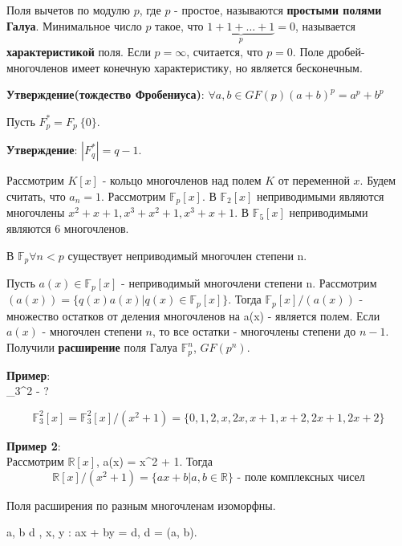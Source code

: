 \documentclass[11pt]{article}
\newcounter{th}\setcounter{th}{0}
\def\th{\par\smallskip\refstepcounter{th}\textbf{\arabic{th}}}
\newtheorem*{Theorem}{Теорема \th}
\begin{document}
Поля вычетов по модулю \(p\), где \(p\) - простое, называются \textbf{простыми полями Галуа}. Минимальное
число \(p\) такое, что \(\underbrace{1 + 1 + \ldots + 1}_{p} = 0\), называется \textbf{характеристикой} поля.
Если \(p = \infty\), считается, что \(p = 0\). Поле дробей-многочленов имеет конечную характеристику,
но является бесконечным.

\textbf{Утверждение(тождество Фробениуса)}: \(\forall a, b \in GF(p) (a + b)^p = a^p + b^p\)

Пусть \(F^*_p = F_p \ \{0\}\).

\textbf{Утверждение}: \(|F^*_q| = q - 1\).

Рассмотрим \(K[x]\) -  кольцо многочленов над полем \(K\) от переменной \(x\). Будем считать, что \(a_n = 1\).
Рассмотрим \(\mathbb{F}_p[x]\).
В \(\mathbb{F}_2[x]\) неприводимыми являются многочлены \(x^2 + x + 1, x^3 + x^2 + 1, x^3 + x + 1\).
В \(\mathbb{F}_5[x]\) неприводимыми являются 6 многочленов.
\begin{Theorem}
В $\mathbb{F}_p \forall n < p$ существует неприводимый многочлен степени n.
\end{Theorem}
Пусть $a(x) \in \mathbb{F}_p[x]$ - неприводимый многочлени степени n. Рассмотрим
$(a(x)) = \{q(x)a(x) | q(x) \in \mathbb{F}_p[x]\}$. Тогда $\mathbb{F}_p[x] / (a(x))$ - множество
остатков от деления многочленов на a(x) - является полем. Если $a(x)$ - многочлен степени $n$, то
все остатки - многочлены степени до $n - 1$. Получили \textbf{расширение} поля Галуа $\mathbb{F}_p^n$,
$GF(p^n)$.

\textbf{Пример}:\\
_3^2 - ?

\begin{equation}
\mathbb{F}_3^2[x] = \mathbb{F}_3^2[x]/(x^2 + 1) = \{0, 1, 2, x, 2x, x + 1, x + 2, 2x + 1, 2x + 2\}
\end{equation}

\textbf{Пример 2}:\\
Рассмотрим $\mathbb{R}[x]$, a(x) = x^2 + 1. Тогда
\begin{equation}
\mathbb{R}[x]/(x^2 + 1) = \{ax + b | a, b \in \mathbb{R}\} \text{ - поле комплексных чисел}
\end{equation}
\begin{Theorem}
Поля расширения по разным многочленам изоморфны.
\end{Theorem}
\begin{Theorem}
\forall a, b \in {} \exists d \in {}, x, y \in {}: ax + by = d, d = (a, b).
\end{Theorem}
\end{document}
